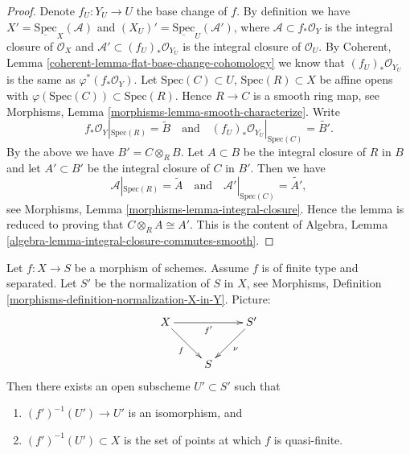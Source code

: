 \begin{proof}
Denote $f_U : Y_U \to U$ the base change of $f$.
By definition we have
$X' = \underline{\text{Spec}}_X(\mathcal{A})$ and
$(X_U)' = \underline{\text{Spec}}_U(\mathcal{A}')$, where
$\mathcal{A} \subset f_*\mathcal{O}_Y$ is the integral closure of
$\mathcal{O}_X$ and $\mathcal{A}' \subset (f_U)_*\mathcal{O}_{Y_U}$
is the integral closure of $\mathcal{O}_U$.
By Coherent, Lemma \ref{coherent-lemma-flat-base-change-cohomology}
we know that $(f_U)_*\mathcal{O}_{Y_U}$ is the same as
$\varphi^*(f_*\mathcal{O}_Y)$.
Let $\text{Spec}(C) \subset U$, $\text{Spec}(R) \subset X$ be
affine opens with $\varphi(\text{Spec}(C)) \subset \text{Spec}(R)$.
Hence $R \to C$ is a smooth ring map, see
Morphisms, Lemma \ref{morphisms-lemma-smooth-characterize}.
Write
$$
f_*\mathcal{O}_Y|_{\text{Spec}(R)} = \widetilde{B}
\quad\text{and}\quad
(f_U)_*\mathcal{O}_{Y_U}|_{\text{Spec}(C)} = \widetilde{B'}.
$$
By the above we have $B' = C \otimes_R B$. Let $A \subset B$ be
the integral closure of $R$ in $B$ and let $A' \subset B'$ be the
integral closure of $C$ in $B'$. Then we have
$$
\mathcal{A}|_{\text{Spec}(R)} = \widetilde{A}
\quad\text{and}\quad
\mathcal{A}'|_{\text{Spec}(C)} = \widetilde{A'},
$$
see Morphisms, Lemma \ref{morphisms-lemma-integral-closure}.
Hence the lemma is reduced to proving that $C \otimes_R A \cong A'$.
This is the content of
Algebra, Lemma \ref{algebra-lemma-integral-closure-commutes-smooth}.
\end{proof}

\begin{lemma}
\label{lemma-finite-type-separated}
Let $f : X \to S$ be a morphism of schemes.
Assume $f$ is of finite type and separated.
Let $S'$ be the normalization of $S$ in $X$, see
Morphisms, Definition \ref{morphisms-definition-normalization-X-in-Y}.
Picture:
$$
\xymatrix{
X \ar[rd]_f \ar[rr]_{f'} & & S' \ar[ld]^\nu \\
& S &
}
$$
Then there exists an open subscheme $U' \subset S'$ such that
\begin{enumerate}
\item $(f')^{-1}(U') \to U'$ is an isomorphism, and
\item $(f')^{-1}(U') \subset X$ is the set of points at which
$f$ is quasi-finite.
\end{enumerate}
\end{lemma}

